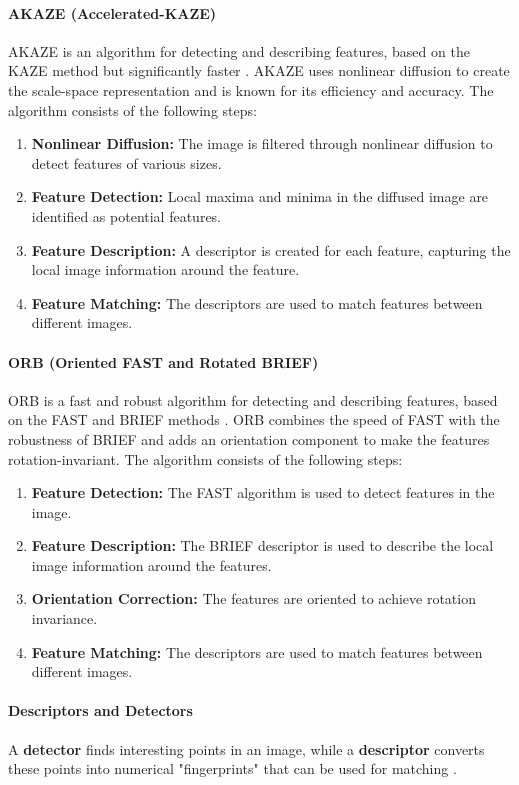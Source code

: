 \documentclass[conference, a4paper]{IEEEtran}
\begin{document}
\paragraph{AKAZE (Accelerated-KAZE)}
AKAZE is an algorithm for detecting and describing features, based on the KAZE method but significantly faster \cite{opencv_akaze}. AKAZE uses nonlinear diffusion to create the scale-space representation and is known for its efficiency and accuracy. The algorithm consists of the following steps:
\begin{enumerate}
	\item \textbf{Nonlinear Diffusion:} The image is filtered through nonlinear diffusion to detect features of various sizes.
	\item \textbf{Feature Detection:} Local maxima and minima in the diffused image are identified as potential features.
	\item \textbf{Feature Description:} A descriptor is created for each feature, capturing the local image information around the feature.
	\item \textbf{Feature Matching:} The descriptors are used to match features between different images.
\end{enumerate}

\paragraph{ORB (Oriented FAST and Rotated BRIEF)}
ORB is a fast and robust algorithm for detecting and describing features, based on the FAST and BRIEF methods \cite{orb}. ORB combines the speed of FAST with the robustness of BRIEF and adds an orientation component to make the features rotation-invariant. The algorithm consists of the following steps:
\begin{enumerate}
	\item \textbf{Feature Detection:} The FAST algorithm is used to detect features in the image.
	\item \textbf{Feature Description:} The BRIEF descriptor is used to describe the local image information around the features.
	\item \textbf{Orientation Correction:} The features are oriented to achieve rotation invariance.
	\item \textbf{Feature Matching:} The descriptors are used to match features between different images.
\end{enumerate}

\paragraph{Descriptors and Detectors}
A \textbf{detector} finds interesting points in an image, while a \textbf{descriptor} converts these points into numerical "fingerprints" that can be used for matching \cite{opencv_features}.
\end{document}
